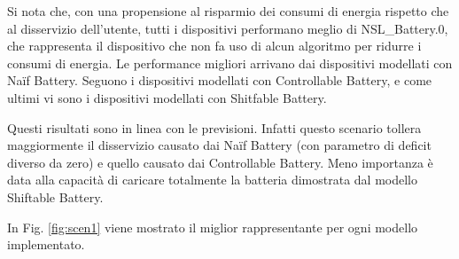 \documentclass[italian, Lau, oneside]{sapthesis}
\begin{document}
Si nota che, con una propensione al risparmio dei consumi di energia rispetto che al disservizio dell'utente, tutti i dispositivi performano meglio di NSL\_Battery.0, che rappresenta il dispositivo che non fa uso di alcun algoritmo per ridurre i consumi di energia. Le performance migliori arrivano dai dispositivi modellati con Naïf Battery. Seguono i dispositivi modellati con Controllable Battery, e come ultimi vi sono i dispositivi modellati con Shitfable Battery.

Questi risultati sono in linea con le previsioni. Infatti questo scenario tollera maggiormente il disservizio causato dai Naïf Battery (con parametro di deficit diverso da zero) e quello causato dai Controllable Battery. Meno importanza è data alla capacità di caricare totalmente la batteria dimostrata dal modello Shiftable Battery.


In Fig. \ref{fig:scen1} viene mostrato il miglior rappresentante per ogni modello implementato.
\end{document}
